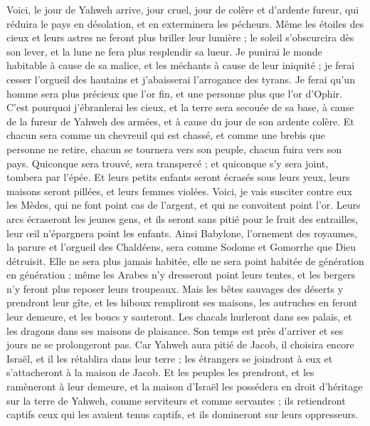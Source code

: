 \begin{multicols}{2}
Voici, le jour de Yahweh arrive, jour cruel, jour de colère et d'ardente fureur, qui réduira le pays en désolation, et en exterminera les pécheurs.
Même les étoiles des cieux et leurs astres ne feront plus briller leur lumière ; le soleil s'obscurcira dès son lever, et la lune ne fera plus resplendir sa lueur.
Je punirai le monde habitable à cause de sa malice, et les méchants à cause de leur iniquité ; je ferai cesser l'orgueil des hautains et j'abaisserai l'arrogance des tyrans.
Je ferai qu'un homme sera plus précieux que l'or fin, et une personne plus que l'or d'Ophir.
C'est pourquoi j'ébranlerai les cieux, et la terre sera secouée de sa base, à cause de la fureur de Yahweh des armées, et à cause du jour de son ardente colère.
Et chacun sera comme un chevreuil qui est chassé, et comme une brebis que personne ne retire, chacun se tournera vers son peuple, chacun fuira vers son pays.
Quiconque sera trouvé, sera transpercé ; et quiconque s'y sera joint, tombera par l'épée.
Et leurs petits enfants seront écrasés sous leurs yeux, leurs maisons seront pillées, et leurs femmes violées.
Voici, je vais susciter contre eux les Mèdes, qui ne font point cas de l'argent, et qui ne convoitent point l'or.
Leurs arcs écraseront les jeunes gens, et ils seront sans pitié pour le fruit des entrailles, leur œil n'épargnera point les enfants.
Ainsi Babylone, l'ornement des royaumes, la parure et l'orgueil des Chaldéens, sera comme Sodome et Gomorrhe que Dieu détruisit.
Elle ne sera plus jamais habitée, elle ne sera point habitée de génération en génération ; même les Arabes n'y dresseront point leurs tentes, et les bergers n'y feront plus reposer leurs troupeaux.
Mais les bêtes sauvages des déserts y prendront leur gîte, et les hiboux rempliront ses maisons, les autruches en feront leur demeure, et les boucs y sauteront.
Les chacals hurleront dans ses palais, et les dragons dans ses maisons de plaisance. Son temps est près d'arriver et ses jours ne se prolongeront pas.
\VerseOne{}Car Yahweh aura pitié de Jacob, il choisira encore Israël, et il les rétablira dans leur terre ; les étrangers se joindront à eux et s'attacheront à la maison de Jacob.
Et les peuples les prendront, et les ramèneront à leur demeure, et la maison d'Israël les possédera en droit d'héritage sur la terre de Yahweh, comme serviteurs et comme servantes ; ils retiendront captifs ceux qui les avaient tenus captifs, et ils domineront sur leurs oppresseurs.

\end{multicols}
